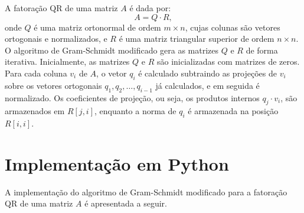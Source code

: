 A fatoração QR de uma matriz \( A \) é dada por:
\begin{equation}
  A = Q \cdot R,
\end{equation}
onde $Q$ é uma matriz ortonormal de ordem \( m \times n \), cujas colunas são vetores ortogonais e normalizados, e $R$ é uma matriz triangular superior de ordem \( n \times n \). O algoritmo de Gram-Schmidt modificado gera as matrizes \( Q \) e \( R \) de forma iterativa. Inicialmente, as matrizes \( Q \) e \( R \) são inicializadas com matrizes de zeros. Para cada coluna \( v_i \) de \( A \), o vetor \( q_i \) é calculado subtraindo as projeções de \( v_i \) sobre os vetores ortogonais \( q_1, q_2, \dots, q_{i-1} \) já calculados, e em seguida é normalizado. Os coeficientes de projeção, ou seja, os produtos internos \( q_j \cdot v_i \), são armazenados em \( R[j, i] \), enquanto a norma de \( q_i \) é armazenada na posição \( R[i, i] \).

\section{Implementação em Python}

A implementação do algoritmo de Gram-Schmidt modificado para a fatoração QR de uma matriz \( A \) é apresentada a seguir.

